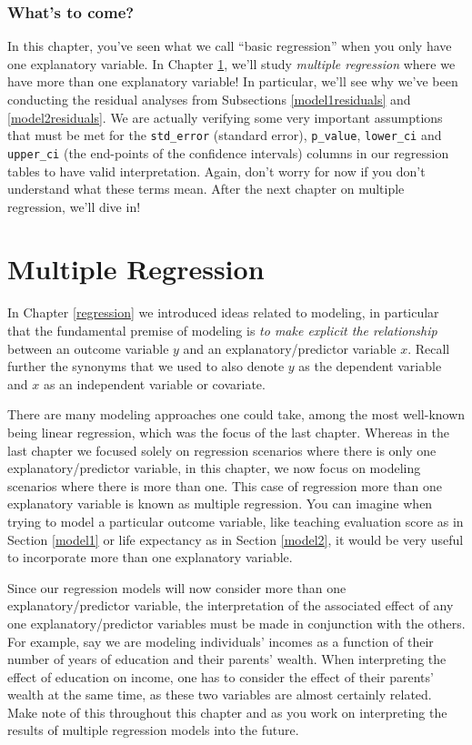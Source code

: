\documentclass[12pt, krantz2,]{krantz}
\begin{document}
\hypertarget{whats-to-come-4}{%
\subsection{What's to come?}\label{whats-to-come-4}}

In this chapter, you've seen what we call ``basic regression'' when you only have one explanatory variable. In Chapter \ref{multiple-regression}, we'll study \emph{multiple regression} where we have more than one explanatory variable! In particular, we'll see why we've been conducting the residual analyses from Subsections \ref{model1residuals} and \ref{model2residuals}. We are actually verifying some very important assumptions that must be met for the \texttt{std\_error} (standard error), \texttt{p\_value}, \texttt{lower\_ci} and \texttt{upper\_ci} (the end-points of the confidence intervals) columns in our regression tables to have valid interpretation. Again, don't worry for now if you don't understand what these terms mean. After the next chapter on multiple regression, we'll dive in!

\hypertarget{multiple-regression}{%
\chapter{Multiple Regression}\label{multiple-regression}}

In Chapter \ref{regression} we introduced ideas related to modeling, in particular that the fundamental premise of modeling is \emph{to make explicit the relationship} between an outcome variable \(y\) and an explanatory/predictor variable \(x\). Recall further the synonyms that we used to also denote \(y\) as the dependent variable and \(x\) as an independent variable or covariate.

There are many modeling approaches one could take, among the most well-known being linear regression, which was the focus of the last chapter. Whereas in the last chapter we focused solely on regression scenarios where there is only one explanatory/predictor variable, in this chapter, we now focus on modeling scenarios where there is more than one. This case of regression more than one explanatory variable is known as multiple regression. You can imagine when trying to model a particular outcome variable, like teaching evaluation score as in Section \ref{model1} or life expectancy as in Section \ref{model2}, it would be very useful to incorporate more than one explanatory variable.

Since our regression models will now consider more than one explanatory/predictor variable, the interpretation of the associated effect of any one explanatory/predictor variables must be made in conjunction with the others. For example, say we are modeling individuals' incomes as a function of their number of years of education and their parents' wealth. When interpreting the effect of education on income, one has to consider the effect of their parents' wealth at the same time, as these two variables are almost certainly related. Make note of this throughout this chapter and as you work on interpreting the results of multiple regression models into the future.
\end{document}
